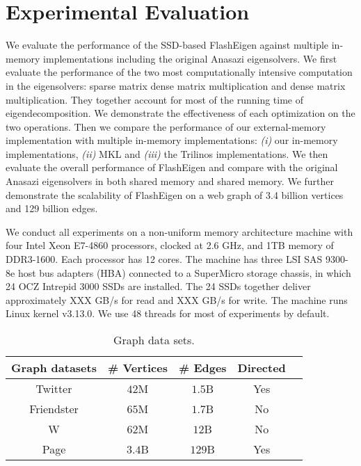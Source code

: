 \section{Experimental Evaluation}

We evaluate the performance of the SSD-based FlashEigen against multiple
in-memory implementations including the original Anasazi eigensolvers.
We first evaluate the performance
of the two most computationally intensive computation in the eigensolvers:
sparse matrix dense matrix multiplication and dense matrix multiplication.
They together account for most of the running time of eigendecomposition.
We demonstrate the effectiveness of each optimization on the two operations.
Then we compare the performance of our external-memory implementation with
multiple in-memory implementations: \textit{(i)} our in-memory implementations,
\textit{(ii)} MKL and \textit{(iii)} the Trilinos implementations. We then
evaluate the overall
performance of FlashEigen and compare with the original Anasazi eigensolvers
in both shared memory and shared memory. We further demonstrate the scalability
of FlashEigen on a web graph of 3.4 billion vertices and 129 billion edges.

We conduct all experiments on a non-uniform memory architecture machine with
four Intel Xeon E7-4860 processors, clocked at 2.6 GHz, and 1TB memory of
DDR3-1600. Each processor has 12 cores. The machine has three LSI SAS 9300-8e
host bus adapters (HBA) connected to a SuperMicro storage chassis, in which
24 OCZ Intrepid 3000 SSDs are installed. The 24 SSDs together deliver
approximately XXX GB/s for read and XXX GB/s for write. The machine runs
Linux kernel v3.13.0. We use 48 threads for most of experiments by default.

\begin{table}
\begin{center}
\footnotesize
\begin{tabular}{|c|c|c|c|c|}
\hline
Graph datasets & \# Vertices & \# Edges & Directed \\
\hline
Twitter \cite{twitter} & $42$M & $1.5$B & Yes \\
\hline
Friendster \cite{} & $65$M & $1.7$B & No \\
\hline
W \cite{} & $62$M & $12$B & No \\
\hline
Page \cite{web_graph} & $3.4$B & $129$B & Yes \\
\hline
\end{tabular}
\normalsize
\end{center}
\vspace{-10pt}
\caption{Graph data sets.}
\label{graphs}
\end{table}

